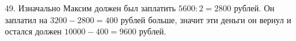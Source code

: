 49. Изначально Максим должен был заплатить $5600:2=2800$ рублей. Он заплатил на $3200-2800=400$ рублей больше, значит эти деньги он вернул и остался должен $10000-400=9600$ рублей.\\
